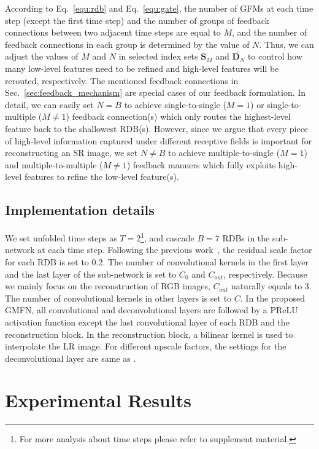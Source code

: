 \documentclass{bmvc2k}
\begin{document}
 According to Eq.~\ref{equ:rdb} and Eq.~\ref{equ:gate}, the number of GFMs at each time step (except the first time step) and the number of groups of feedback connections between two adjacent time steps are equal to $M$, and the number of feedback connections in each group is determined by the value of $N$. Thus, we can adjust the values of $M$ and $N$ in selected index sets $\mathbf{S}_{M}$ and $\mathbf{D}_{N}$ to control how many low-level features need to be refined and high-level features will be rerouted, respectively. The mentioned feedback connections in Sec.~\ref{sec:feedback_mechanism} are special cases of our feedback formulation. In detail, we can easily set $N=B$ to achieve single-to-single ($M=1$) or single-to-multiple ($M\neq1$) feedback connection(s) which only routes the highest-level feature back to the shallowest RDB(s). However, since we argue that every piece of high-level information captured under different receptive fields is important for reconstructing an SR image, we set $N\neq B$ to achieve multiple-to-single ($M=1$) and multiple-to-multiple ($M\neq1$) feedback manners which fully exploits high-level features to refine the low-level feature(s). 
		\vspace{-\topsep}
\subsection{Implementation details}
\label{sec:id}
We set unfolded time steps as $T=2$\footnote{For more analysis about time steps please refer to supplement material.}, and cascade $B=7$ RDBs in the sub-network at each time step. Following the previous work~\cite{wang2018esrgan}, the residual scale factor for each RDB is set to 0.2. The number of convolutional kernels in the first layer and the last layer of the sub-network is set to $C_{0}$ and $C_{out}$, respectively. Because we mainly focus on the reconstruction of RGB images, $C_{out}$ naturally equals to 3. The number of convolutional kernels in other layers is set to $C$. In the proposed GMFN, all convolutional and deconvolutional layers are followed by a PReLU \cite{he2015delving} activation function except the last convolutional layer of each RDB and the reconstruction block. In the reconstruction block, a bilinear kernel is used to interpolate the LR image. For different upscale factors, the settings for the deconvolutional layer are same as \cite{li2019srfbn}.
	\vspace{-\topsep}
	\section{Experimental Results}
	
\end{document}
